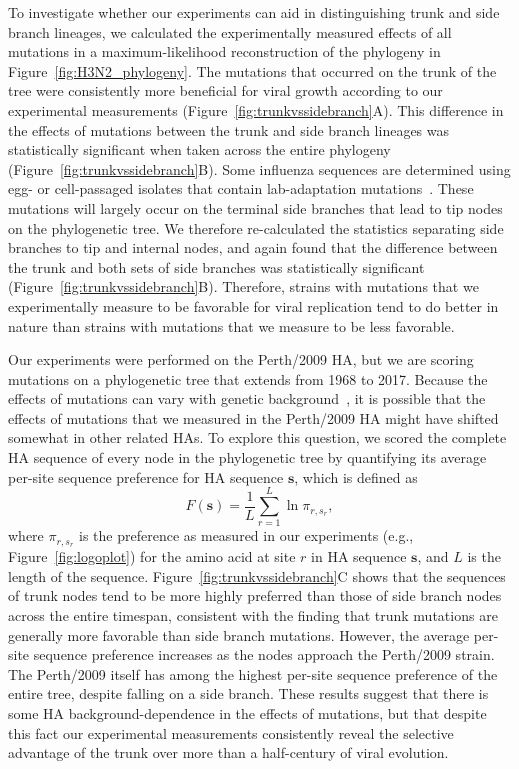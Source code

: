 \documentclass[9pt,twocolumn,twoside]{pnas-new}
\begin{document}
To investigate whether our experiments can aid in distinguishing trunk and side branch lineages, we calculated the experimentally measured effects of all mutations in a maximum-likelihood reconstruction of the phylogeny in Figure~\ref{fig:H3N2_phylogeny}.
The mutations that occurred on the trunk of the tree were consistently more beneficial for viral growth according to our experimental measurements (Figure~\ref{fig:trunkvssidebranch}A).
This difference in the effects of mutations between the trunk and side branch lineages was statistically significant when taken across the entire phylogeny (Figure~\ref{fig:trunkvssidebranch}B).
Some influenza sequences are determined using egg- or cell-passaged isolates that contain lab-adaptation mutations~\citep{wu2017structural,mcwhite2016sequence,skowronski2016mutations}.
These mutations will largely occur on the terminal side branches that lead to tip nodes on the phylogenetic tree.
We therefore re-calculated the statistics separating side branches to tip and internal nodes, and again found that the difference between the trunk and both sets of side branches was statistically significant (Figure~\ref{fig:trunkvssidebranch}B).
Therefore, strains with mutations that we experimentally measure to be favorable for viral replication tend to do better in nature than strains with mutations that we measure to be less favorable. 

Our experiments were performed on the Perth/2009 HA, but we are scoring mutations on a phylogenetic tree that extends from 1968 to 2017.
Because the effects of mutations can vary with genetic background~\cite{gong2013stability,natarajan2013epistasis,harms2014historical,starr2016epistasis,starr2017alternative}, it is possible that the effects of mutations that we measured in the Perth/2009 HA might have shifted somewhat in other related HAs.
To explore this question, we scored the complete HA sequence of every node in the phylogenetic tree by quantifying its average per-site sequence preference for HA sequence $\mathbf{s}$, which is defined as 
\begin{equation}
F\left(\mathbf{s}\right) = \frac{1}{L}\displaystyle\sum_{r=1}^L \ln \pi_{r, s_r},
\end{equation}
where $\pi_{r, s_r}$ is the preference as measured in our experiments (e.g., Figure~\ref{fig:logoplot}) for the amino acid at site $r$ in HA sequence $\mathbf{s}$, and $L$ is the length of the sequence.
Figure~\ref{fig:trunkvssidebranch}C shows that the sequences of trunk nodes tend to be more highly preferred than those of side branch nodes across the entire timespan, consistent with the finding that trunk mutations are generally more favorable than side branch mutations. 
However, the average per-site sequence preference increases as the nodes approach the Perth/2009 strain.
The Perth/2009 itself has among the highest per-site sequence preference of the entire tree, despite falling on a side branch.
These results suggest that there is some HA background-dependence in the effects of mutations, but that despite this fact our experimental measurements consistently reveal the selective advantage of the trunk over more than a half-century of viral evolution.
\end{document}
